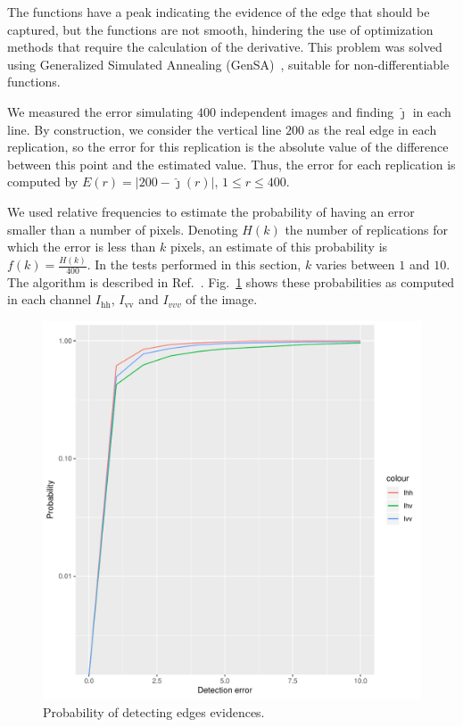 \documentclass[conference]{IEEEtran}
\begin{document}
The functions have a peak indicating the evidence of the edge that should be captured, but the functions are not smooth, hindering the use of optimization methods that require the calculation of the derivative.
This problem was solved using Generalized Simulated Annealing (GenSA)~\cite{xgsh}, suitable for non-differentiable functions.
    
We measured the error simulating $400$ independent images and finding $\widehat\jmath$ in each line.
By construction, we consider the vertical line $200$ as the real edge in each replication, so the error for this replication is the absolute value of the difference between this point and the estimated value. 
Thus, the error for each replication is computed by $E(r) = |200 - \widehat{\jmath}(r)|$, $1\leq r \leq 400$.

We used relative frequencies to estimate the probability of having an error smaller than a number of pixels. 
Denoting $H(k)$ the number of replications for which the error is less than $k$ pixels, an estimate of this probability is $f(k)=\frac{H(k)}{400}$. 
In the tests performed in this section, $k$ varies between $1$ and $10$. 
The algorithm is described in Ref.~\cite{fbgm}.
Fig.~\ref{probability_edge_detc} shows these probabilities as computed in each channel $I_\text{hh}$, $I_\text{vv}$ and $I_{vvv}$ of the image. 
  
\begin{figure}[hbt]
	\centering
	\includegraphics[width=.7\linewidth]{metricas_ihh_ivh_ivv_nhfc_artigos}%
	\caption{Probability of detecting edges evidences.}
\label{probability_edge_detc}
\end{figure}
\end{document}
